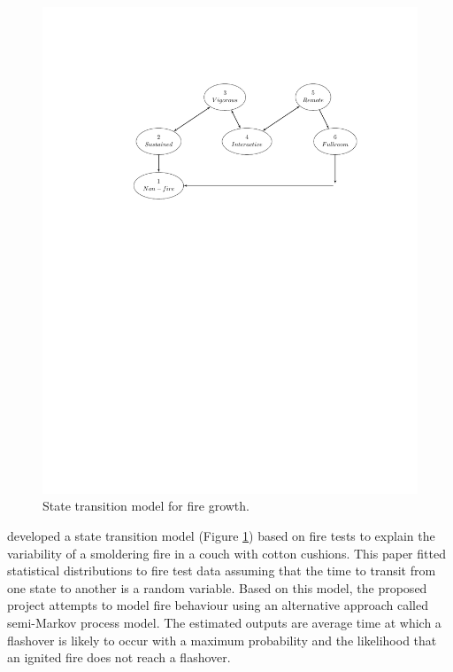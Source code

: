 \documentclass[12pt]{asme2ej}
\begin{document}
\begin{figure}[h!] \centering
  \includegraphics[scale=0.8]{FireGrowthStateSpace}
  \caption{State transition model for fire growth.\label{fig:FireGrowthStateSpace}} 
\end{figure}

\cite{Berlin1985} developed a state transition model (Figure \ref{fig:FireGrowthStateSpace}) based on fire tests to explain the variability of a smoldering fire in a couch with cotton cushions. This paper fitted statistical distributions to fire test data assuming that the time to transit from one state to another is a random variable. 
Based on this model, the proposed project attempts to model fire behaviour using an alternative approach called semi-Markov process model. The estimated outputs are average time at which a flashover is likely to occur with a maximum probability and the likelihood that an ignited fire does not reach a flashover. 
\end{document}
